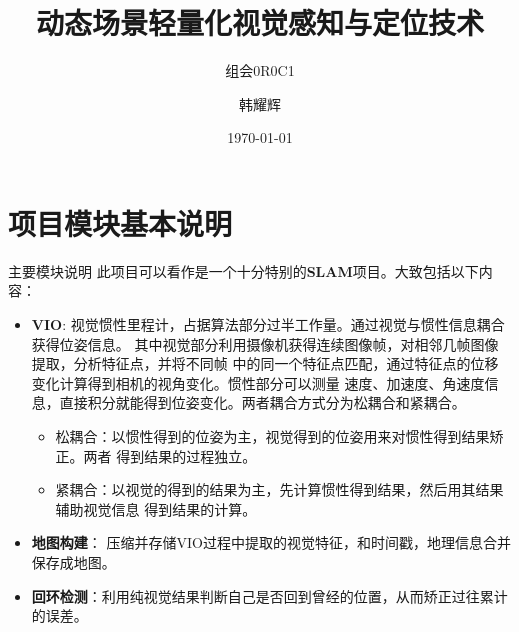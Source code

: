 \documentclass[10pt,aspectratio=169]{beamer}
\title{动态场景轻量化视觉感知与定位技术}
\subtitle{组会0R0C1}
\author{韩耀辉}
\institute{西北工业大学 电子信息学院}
\date{\today}
\begin{document}
\begin{frame}
  \titlepage
\end{frame}

\begin{frame}
  \tableofcontents
\end{frame}

\section{项目模块基本说明}
\begin{frame}{主要模块说明}
此项目可以看作是一个十分特别的\textbf{SLAM}项目。大致包括以下内容：
\vspace{1cm}
  \begin{itemize}
    \item \textbf{VIO}: 视觉惯性里程计，占据算法部分过半工作量。通过视觉与惯性信息耦合获得位姿信息。
      其中视觉部分利用摄像机获得连续图像帧，对相邻几帧图像提取，分析特征点，并将不同帧
      中的同一个特征点匹配，通过特征点的位移变化计算得到相机的视角变化。惯性部分可以测量
      速度、加速度、角速度信息，直接积分就能得到位姿变化。两者耦合方式分为松耦合和紧耦合。
      \begin{itemize}
        \item 松耦合：以惯性得到的位姿为主，视觉得到的位姿用来对惯性得到结果矫正。两者
          得到结果的过程独立。
        \item 紧耦合：以视觉的得到的结果为主，先计算惯性得到结果，然后用其结果辅助视觉信息
          得到结果的计算。
      \end{itemize}
    \item \textbf{地图构建}： 压缩并存储VIO过程中提取的视觉特征，和时间戳，地理信息合并
      保存成地图。
    \item \textbf{回环检测}：利用纯视觉结果判断自己是否回到曾经的位置，从而矫正过往累计的误差。
  \end{itemize}
\end{frame}
\end{document}
